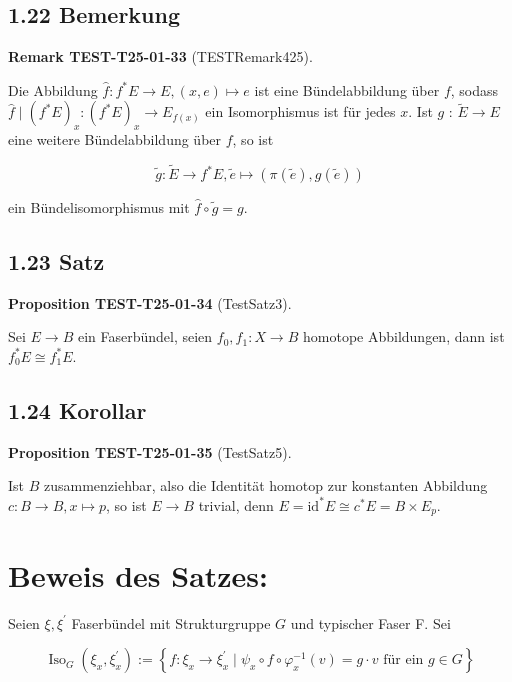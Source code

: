 \documentclass[10pt, letterpaper]{article}
\newcommand{\CustomHeading}[3]{%
  \par\medskip\noindent%
  \textbf{#1 #2} \textnormal{(#3)}.\enskip%
}
\newenvironment{PROP}[2]{\begin{unitbox}\CustomHeading{Proposition}{#1}{#2}}{\end{unitbox}}
\newenvironment{REM}[2]{\begin{unitbox}\CustomHeading{Remark}{#1}{#2}}{\end{unitbox}}
\begin{document}
\subsection*{1.22 Bemerkung}
\begin{REM}{TEST-T25-01-33}{TESTRemark425}
Die Abbildung $\hat{f}: f^{*} E \rightarrow E,(x, e) \mapsto e$ ist eine Bündelabbildung über $f$, sodass $\hat{f} \mid\left(f^{*} E\right)_{x}:\left(f^{*} E\right)_{x} \rightarrow E_{f(x)}$ ein Isomorphismus ist für jedes $x$. Ist $g$ : $\widetilde{E} \rightarrow E$ eine weitere Bündelabbildung über $f$, so ist

$$
\tilde{g}: \widetilde{E} \rightarrow f^{*} E, \tilde{e} \mapsto(\pi(\tilde{e}), g(\tilde{e}))
$$

ein Bündelisomorphismus mit $\hat{f} \circ \tilde{g}=g$.
\end{REM}

\subsection*{1.23 Satz}
\begin{PROP}{TEST-T25-01-34}{TestSatz3}
Sei $E \rightarrow B$ ein Faserbündel, seien $f_{0}, f_{1}: X \rightarrow B$ homotope Abbildungen, dann ist $f_{0}^{*} E \cong f_{1}^{*} E$.
\end{PROP}

\subsection*{1.24 Korollar}
\begin{PROP}{TEST-T25-01-35}{TestSatz5}
Ist $B$ zusammenziehbar, also die Identität homotop zur konstanten Abbildung $c: B \rightarrow B, x \mapsto p$, so ist $E \rightarrow B$ trivial, denn $E=\mathrm{id}^{*} E \cong c^{*} E=B \times E_{p}$.
\end{PROP}

\section*{Beweis des Satzes:}
Seien $\xi, \xi^{\prime}$ Faserbündel mit Strukturgruppe $G$ und typischer Faser F. Sei

$$
\operatorname{Iso}_{G}\left(\xi_{x}, \xi_{x}^{\prime}\right):=\left\{f: \xi_{x} \rightarrow \xi_{x}^{\prime} \mid \psi_{x} \circ f \circ \varphi_{x}^{-1}(v)=g \cdot v \text { für ein } g \in G\right\}
$$
\end{document}
